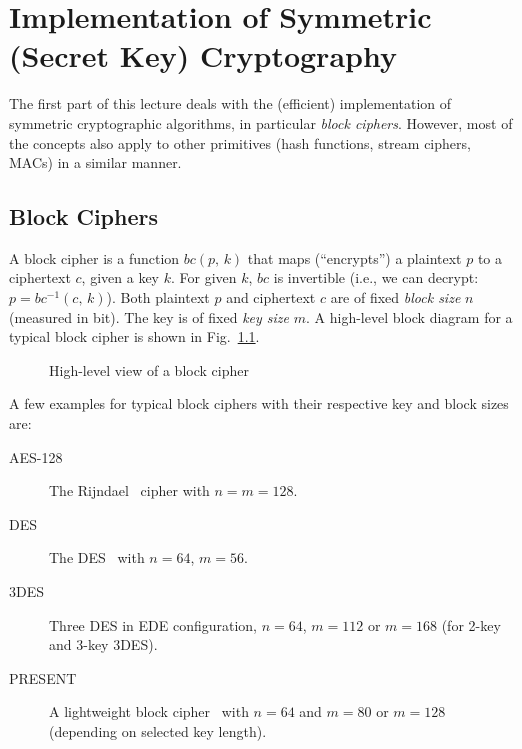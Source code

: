 
\chapter{Implementation of Symmetric (Secret Key) Cryptography}
\thispagestyle{fancy}

\label{chap:symmetric_crypto}
The first part of this lecture deals with the (efficient) implementation of symmetric cryptographic algorithms, in particular \emph{block ciphers}. However, most of the concepts also apply to other primitives (hash functions, stream ciphers, \acp{MAC}) in a similar manner.

\section{Block Ciphers}
A block cipher is a function $bc\left(p,\,k\right)$ that maps (``encrypts'') a plaintext $p$ to a ciphertext $c$, given a key $k$. For given $k$, $bc$ is invertible (i.e., we can decrypt: $p = bc^{-1}\left(c,\,k\right)$). Both plaintext $p$ and ciphertext $c$ are of fixed \emph{block size} $n$ (measured in bit). The key is of fixed \emph{key size} $m$. A high-level block diagram for a typical block cipher is shown in Fig.~\ref{fig:symmetric_crypto:blockcipher}.

\begin{figure}[h!tb]
		\center
			
		\caption{High-level view of a block cipher}
		\label{fig:symmetric_crypto:blockcipher}
\end{figure} 

\noindent A few examples for typical block ciphers with their respective key and block sizes are:

\begin{description}
	\item[\ac{AES}-128] The Rijndael~\cite{Daemen99} cipher with $n = m = 128$.
	\item[\ac{DES}] The \acl{DES}~\cite{fips_des} with $n = 64$, $m = 56$.
	\item[\ac{3DES}] Three \ac{DES} in \ac{EDE} configuration, $n = 64$, $m = 112$ or $m = 168$ (for 2-key and 3-key \ac{3DES}).
	\item[PRESENT] A lightweight block cipher~\cite{PresentCipher} with $n = 64$ and $m = 80$ or $m = 128$ (depending on selected key length).
\end{description}

